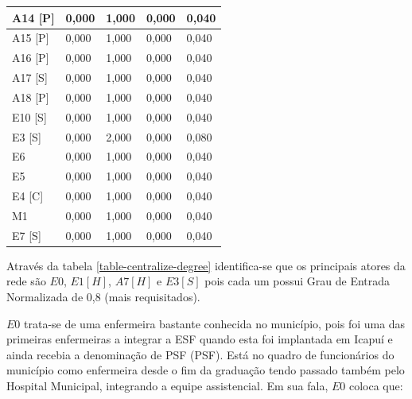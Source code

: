 \begin{table}[htbp]
\begin{tabular}{|l|l|l|l|l|}
A14 {[}P{]}   & 0,000         & 1,000           & 0,000                     & 0,040                       \\ \hline
A15 {[}P{]}   & 0,000         & 1,000           & 0,000                     & 0,040                       \\ \hline
A16 {[}P{]}   & 0,000         & 1,000           & 0,000                     & 0,040                       \\ \hline
A17 {[}S{]}   & 0,000         & 1,000           & 0,000                     & 0,040                       \\ \hline
A18 {[}P{]}   & 0,000         & 1,000           & 0,000                     & 0,040                       \\ \hline
E10 {[}S{]}   & 0,000         & 1,000           & 0,000                     & 0,040                       \\ \hline
E3 {[}S{]}    & 0,000         & 2,000           & 0,000                     & 0,080                       \\ \hline
E6            & 0,000         & 1,000           & 0,000                     & 0,040                       \\ \hline
E5            & 0,000         & 1,000           & 0,000                     & 0,040                       \\ \hline
E4 {[}C{]}    & 0,000         & 1,000           & 0,000                     & 0,040                       \\ \hline
M1            & 0,000         & 1,000           & 0,000                     & 0,040                       \\ \hline
E7 {[}S{]}    & 0,000         & 1,000           & 0,000                     & 0,040                       \\ \hline
\end{tabular}
\end{table}

Através da tabela \ref{table-centralize-degree} identifica-se que os principais atores da rede são $E0$, $E1[H]$, $A7 [H]$ e  $E3[S]$ pois cada um possui Grau de Entrada Normalizada de 0,8 (mais requisitados).

$E0$ trata-se de uma enfermeira bastante conhecida no município, pois foi uma das primeiras enfermeiras a integrar a ESF quando esta foi implantada em Icapuí e ainda recebia a denominação de \acrlong{PSF} (\acrshort{PSF}). Está no quadro de funcionários do município como enfermeira desde o fim da graduação tendo passado também pelo Hospital Municipal, integrando a equipe assistencial. Em sua fala, $E0$ coloca que: 

